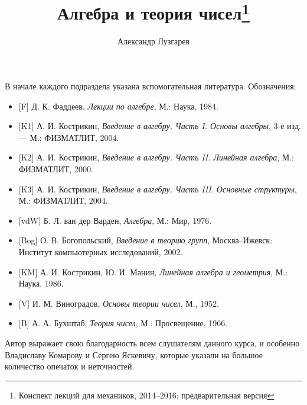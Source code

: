 \documentclass[12pt]{article}
\theoremstyle{plain}
\theoremstyle{remark}
\theoremstyle{definition}
\begin{document}
\title{Алгебра и теория чисел\footnote{Конспект
    лекций для механиков, 2014--2016; предварительная
    версия}}
\author{Александр Лузгарев}
\date{}

\maketitle

\tableofcontents

\vfill

В начале каждого подраздела указана вспомогательная
литература. Обозначения:

\begin{itemize}
\item {}[F] Д. К. Фаддеев, {\it Лекции по алгебре}, М.: Наука, 1984.
\item {}[K1] А. И. Кострикин, {\it Введение в алгебру. Часть I. Основы
    алгебры}, 3-е изд. --- М.: ФИЗМАТЛИТ, 2004.
\item {}[K2] А. И. Кострикин, {\it Введение в алгебру. Часть II. Линейная
    алгебра}, М.: ФИЗМАТЛИТ, 2000.
\item {}[K3] А. И. Кострикин, {\it Введение в алгебру. Часть
    III. Основные структуры}, М.: ФИЗ\-МАТЛИТ, 2004.
\item {}[vdW] Б. Л. ван дер Варден, {\it Алгебра}, М.: Мир, 1976.
\item {}[Bog] О. В. Богопольский, {\it Введение в теорию групп},
  Москва--Ижевск: Институт компьютерных исследований, 2002.
\item {}[KM] А. И. Кострикин, Ю. И. Манин, {\it Линейная алгебра и
    геометрия}, М.: Наука, 1986.
\item {}[V] И. М. Виноградов, {\it Основы теории чисел}, М., 1952.
\item {}[B] А. А. Бухштаб, {\it Теория чисел}, М.: Просвещение, 1966.
\end{itemize}

Автор выражает свою благодарность всем слушателям данного курса, и особенно
Владиславу Комарову и Сергею Яскевичу, которые указали на большое количество
опечаток и неточностей.

\vfill\eject













\clearpage
{}

\end{document}
